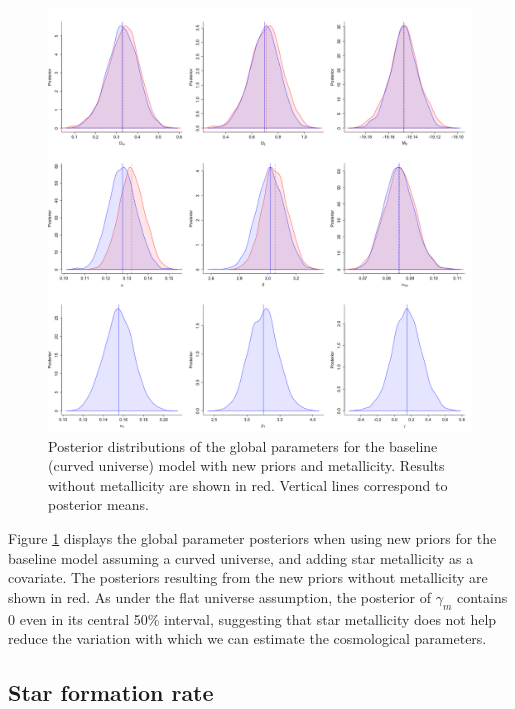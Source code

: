 \begin{figure}
\centering
	\includegraphics[width=\textwidth]{figures/ode/split_meth_curv_camp.png}
\caption{Posterior distributions of the global parameters for the baseline (curved universe) model with new priors and metallicity. Results without metallicity are shown in red. Vertical lines correspond to posterior means.}
\label{fig:ode_meth_curv}
\end{figure}

Figure \ref{fig:ode_meth_curv} displays the global parameter posteriors when using new priors for the baseline model assuming a curved universe, and adding star metallicity as a covariate. The posteriors resulting from the new priors without metallicity are shown in red. As under the flat universe assumption, the posterior of $\gamma_{m}$ contains 0 even in its central 50\% interval, suggesting that star metallicity does not help reduce the variation with which we can estimate the cosmological parameters.

\subsection{Star formation rate}
\label{sec:ode_results_rate}

